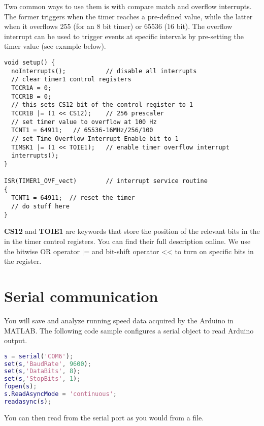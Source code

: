 \documentclass[a4paper,10pt]{article}
\begin{document}
Two common ways to 
use them is with compare match and overflow interrupts. The former triggers when the timer
reaches a pre-defined value, while the latter when it overflows 255 (for an 8 bit timer) or 
65536 (16 bit). The overflow interrupt can be used to trigger events at specific intervals
by pre-setting the timer value (see example below).

\begin{lstlisting}
void setup() {
  noInterrupts();           // disable all interrupts
  // clear timer1 control registers
  TCCR1A = 0;
  TCCR1B = 0;
  // this sets CS12 bit of the control register to 1
  TCCR1B |= (1 << CS12);    // 256 prescaler 
  // set timer value to overflow at 100 Hz
  TCNT1 = 64911;   // 65536-16MHz/256/100
  // set Time Overflow Interrupt Enable bit to 1
  TIMSK1 |= (1 << TOIE1);   // enable timer overflow interrupt
  interrupts();  
}

ISR(TIMER1_OVF_vect)        // interrupt service routine 
{
  TCNT1 = 64911;  // reset the timer
  // do stuff here
}
\end{lstlisting}

\textbf{CS12} and \textbf{TOIE1} are keywords that store the position of the relevant bits in the 
in the timer control registers. You can find their full description online. We use 
the bitwise OR operator |= and bit-shift operator << to turn on specific bits in 
the register.

\section{Serial communication}
You will save and analyze running speed data acquired by the Arduino in MATLAB.
The following code sample configures a serial object to read Arduino
output.

\begin{lstlisting}[language=matlab]
 % initialize serial communication
s = serial('COM6');
set(s,'BaudRate', 9600);
set(s,'DataBits', 8);
set(s,'StopBits', 1);
fopen(s);
s.ReadAsyncMode = 'continuous';
readasync(s);
\end{lstlisting}

You can then read from the serial port as you would from a file.
\end{document}
